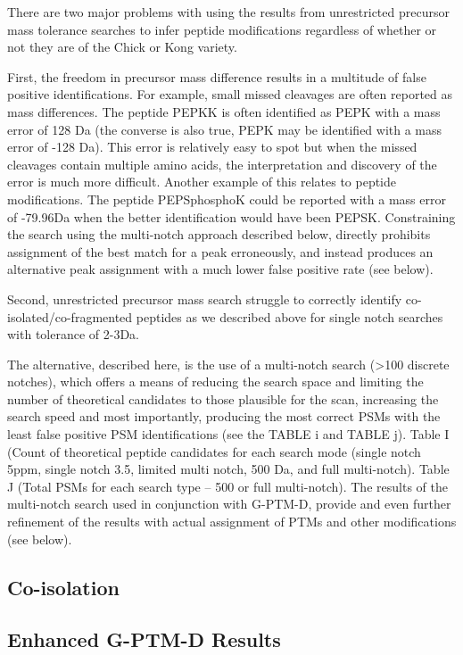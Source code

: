 \documentclass[journal=jprobs,manuscript=article]{achemso}
\begin{document}
There are two major problems with using the results from unrestricted precursor mass tolerance searches to infer peptide modifications regardless of whether or not they are of the Chick or Kong variety.

First, the freedom in precursor mass difference results in a multitude of false positive identifications.
For example, small missed cleavages are often reported as mass differences.
The peptide PEPKK is often identified as PEPK with a mass error of 128 Da (the converse is also true, PEPK may be identified with a mass error of -128 Da).
This error is relatively easy to spot but when the missed cleavages contain multiple amino acids, the interpretation and discovery of the error is much more difficult.
Another example of this relates to peptide modifications.
The peptide PEPSphosphoK could be reported with a mass error of -79.96Da when the better identification would have been PEPSK.
Constraining the search using the multi-notch approach described below, directly prohibits assignment of the best match for a peak erroneously, and instead produces an alternative peak assignment with a much lower false positive rate (see below).

Second, unrestricted precursor mass search struggle to correctly identify co-isolated/co-fragmented peptides as we described above for single notch searches with tolerance of 2-3Da.

The alternative, described here, is the use of a multi-notch search (>100 discrete notches), which offers a means of reducing the search space and limiting the number of theoretical candidates to those plausible for the scan, increasing the search speed and most importantly, producing the most correct PSMs with the least false positive PSM identifications (see the TABLE i and TABLE j).
Table I (Count of theoretical peptide candidates for each search mode (single notch 5ppm, single notch 3.5, limited multi notch, 500 Da, and full multi-notch).
Table J (Total PSMs for each search type – 500 or full multi-notch).
The results of the multi-notch search used in conjunction with G-PTM-D, provide and even further refinement of the results with actual assignment of PTMs and other modifications (see below). 

\subsection{Co-isolation}

\subsection{Enhanced G-PTM-D Results}
\end{document}

